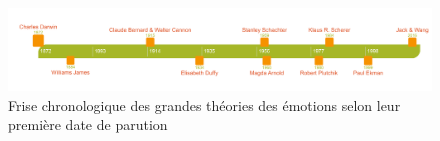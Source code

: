 \begin{figure}
  \centering
  \includegraphics[width=16cm]{./Chapitre1/figures/friseHisto.png}
  \caption{Frise chronologique des grandes théories des émotions selon leur première date de parution}
  \label{fig:Circumplex}
\end{figure}
